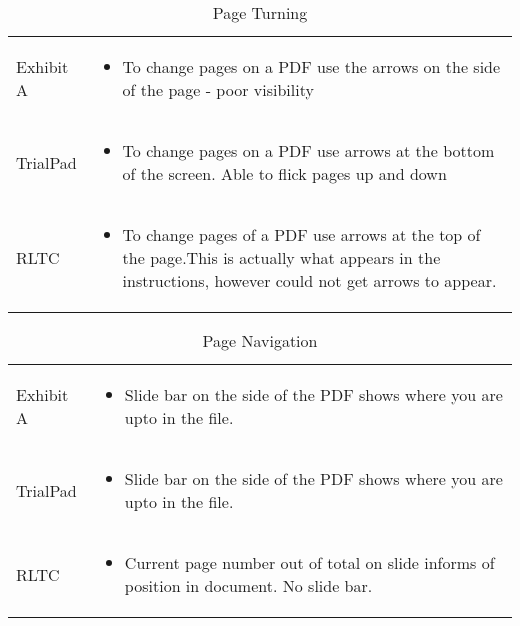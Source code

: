 \begin{center}
\begin{table}[htbp]
\label{tab:Document Handling}    
\caption{Page Turning}
\small
\centering
\begin{tabular}{|p{}|p{}|}
\hline
\rowcolor{lightgrey}\multicolumn{2}{|c|}{Page Turning}\\
\hline
Exhibit A & \begin{itemize}
    \item To change pages on a PDF use the arrows on the side of the page - poor visibility
\end{itemize}\\
\hline
TrialPad & \begin{itemize}
    \item To change pages on a PDF use arrows at the bottom of the screen. Able to flick pages up and down
\end{itemize}\\
\hline
RLTC & \begin{itemize}
    \item To change pages of a PDF use arrows at the top of the page.This is actually what appears in the instructions, however could not get arrows to appear.
 
\end{itemize}\\
\hline
\end{tabular}

\end{table}
\end{center}

\begin{center}
\begin{table}[h!]
\label{tab:PageNavigation}    
\caption{Page Navigation}
\centering
\begin{tabular}{|p{}|p{}|}

\rowcolor{lightgrey}\multicolumn{2}{|c|}{Page Navigation}\\
\hline
Exhibit A & \begin{itemize}
    \item Slide bar on the side of the PDF shows where you are upto in the file.
\end{itemize}\\
\hline
TrialPad & \begin{itemize}
    \item Slide bar on the side of the PDF shows where you are upto in the file.
\end{itemize}\\
\hline
RLTC & \begin{itemize}
    \item Current page number out of total on slide informs of position in document. No slide bar.
\end{itemize}\\
\hline
\end{tabular}


\end{table}
\end{center}

